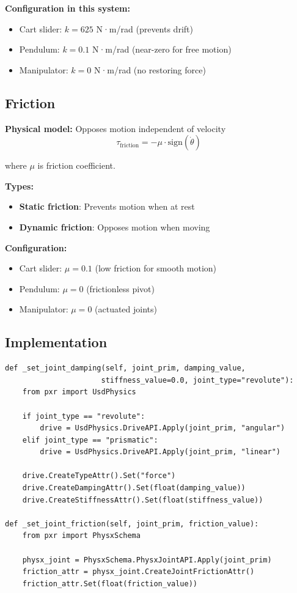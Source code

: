 \documentclass[11pt,a4paper]{article}
\begin{document}
\textbf{Configuration in this system:}
\begin{itemize}
    \item Cart slider: $k = 625$ N·m/rad (prevents drift)
    \item Pendulum: $k = 0.1$ N·m/rad (near-zero for free motion)
    \item Manipulator: $k = 0$ N·m/rad (no restoring force)
\end{itemize}

\subsection{Friction}

\textbf{Physical model:} Opposes motion independent of velocity
\begin{equation}
\tau_{\text{friction}} = -\mu \cdot \text{sign}(\dot{\theta})
\end{equation}

where $\mu$ is friction coefficient.

\textbf{Types:}
\begin{itemize}
    \item \textbf{Static friction}: Prevents motion when at rest
    \item \textbf{Dynamic friction}: Opposes motion when moving
\end{itemize}

\textbf{Configuration:}
\begin{itemize}
    \item Cart slider: $\mu = 0.1$ (low friction for smooth motion)
    \item Pendulum: $\mu = 0$ (frictionless pivot)
    \item Manipulator: $\mu = 0$ (actuated joints)
\end{itemize}

\subsection{Implementation}

\begin{lstlisting}
def _set_joint_damping(self, joint_prim, damping_value, 
                      stiffness_value=0.0, joint_type="revolute"):
    from pxr import UsdPhysics
    
    if joint_type == "revolute":
        drive = UsdPhysics.DriveAPI.Apply(joint_prim, "angular")
    elif joint_type == "prismatic":
        drive = UsdPhysics.DriveAPI.Apply(joint_prim, "linear")
    
    drive.CreateTypeAttr().Set("force")
    drive.CreateDampingAttr().Set(float(damping_value))
    drive.CreateStiffnessAttr().Set(float(stiffness_value))

def _set_joint_friction(self, joint_prim, friction_value):
    from pxr import PhysxSchema
    
    physx_joint = PhysxSchema.PhysxJointAPI.Apply(joint_prim)
    friction_attr = physx_joint.CreateJointFrictionAttr()
    friction_attr.Set(float(friction_value))
\end{lstlisting}
\end{document}
